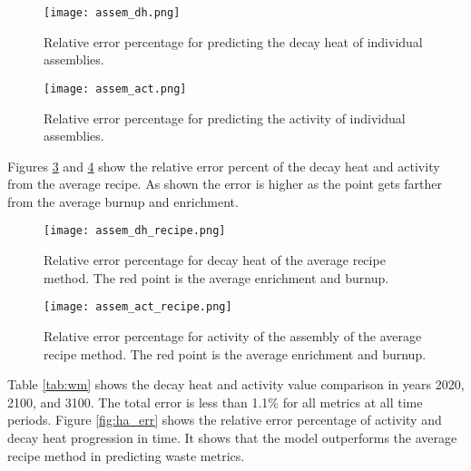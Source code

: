 \begin{figure}
    \centering
    \texttt{[image: assem\_dh.png]}
    \caption{Relative error percentage for predicting the decay
             heat of individual assemblies.}
    \label{fig:assem_dh}
\end{figure}


\begin{figure}
    \centering
    \texttt{[image: assem\_act.png]}
    \caption{Relative error percentage for predicting the
             activity of individual assemblies.}
    \label{fig:assem_act}
\end{figure}


Figures \ref{fig:assem_dh_recipe} and
\ref{fig:assem_act_recipe} show the relative error percent
of the decay heat and activity from the average recipe.
As shown the error is higher as the point gets farther from
the average burnup and enrichment.



\begin{figure}
    \centering
    \texttt{[image: assem\_dh\_recipe.png]}
    \caption{Relative error percentage for decay heat
             of the average recipe
             method. The red point is the average enrichment and
             burnup.}
    \label{fig:assem_dh_recipe}
\end{figure}

\begin{figure}
    \centering
    \texttt{[image: assem\_act\_recipe.png]}
    \caption{Relative error percentage for activity
             of the assembly of the average recipe
             method. The red point is the average enrichment and
             burnup.}
    \label{fig:assem_act_recipe}
\end{figure}

\FloatBarrier


Table \ref{tab:wm} shows the decay heat and activity value
comparison in years 2020, 2100, and 3100. The total
error is less than 1.1\% for all metrics at all time periods.
Figure \ref{fig:ha_err} shows the relative error percentage
of activity and decay heat progression in time. It shows
that the model outperforms the average recipe method
in predicting waste metrics.


